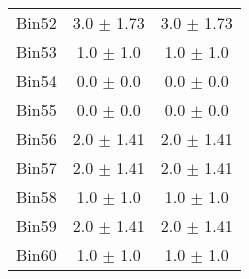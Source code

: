 \begin{tabular}{|c|c|c|}
     Bin52 & 3.0 $\pm$ 1.73 & 3.0 $\pm$ 1.73 \\ \cline{1-3} 
     Bin53 & 1.0 $\pm$ 1.0 & 1.0 $\pm$ 1.0 \\ \cline{1-3} 
     Bin54 & 0.0 $\pm$ 0.0 & 0.0 $\pm$ 0.0 \\ \cline{1-3} 
     Bin55 & 0.0 $\pm$ 0.0 & 0.0 $\pm$ 0.0 \\ \cline{1-3} 
     Bin56 & 2.0 $\pm$ 1.41 & 2.0 $\pm$ 1.41 \\ \cline{1-3} 
     Bin57 & 2.0 $\pm$ 1.41 & 2.0 $\pm$ 1.41 \\ \cline{1-3} 
     Bin58 & 1.0 $\pm$ 1.0 & 1.0 $\pm$ 1.0 \\ \cline{1-3} 
     Bin59 & 2.0 $\pm$ 1.41 & 2.0 $\pm$ 1.41 \\ \cline{1-3} 
     Bin60 & 1.0 $\pm$ 1.0 & 1.0 $\pm$ 1.0 \\ \cline{1-3} 
  \end{tabular}
